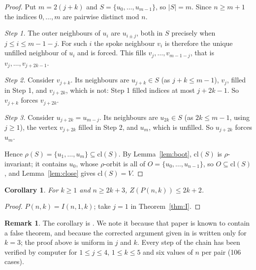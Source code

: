 \documentclass[11pt]{article}
\newtheorem{corollary}[theorem]{Corollary}
\theoremstyle{definition}
\newtheorem{remark}[theorem]{Remark}
\begin{document}
\begin{proof}
Put $m=2(j+k)$ and $S=\{u_0,\dots,u_{m-1}\}$, so $|S|=m$. Since
$n\ge m+1$ the indices $0,\dots,m$ are pairwise distinct mod $n$.

\emph{Step 1.} The outer neighbours of $u_i$ are $u_{i\pm j}$, both in $S$
precisely when $j\le i\le m-1-j$. For such $i$ the spoke neighbour $v_i$ is
therefore the unique unfilled neighbour of $u_i$ and is forced. This fills
$v_j,\dots,v_{m-1-j}$, that is $v_j,\dots,v_{j+2k-1}$.

\emph{Step 2.} Consider $v_{j+k}$. Its neighbours are $u_{j+k}\in S$ (as
$j+k\le m-1$), $v_{j}$, filled in Step 1, and $v_{j+2k}$, which is not:
Step 1 filled indices at most $j+2k-1$. So $v_{j+k}$ forces $v_{j+2k}$.

\emph{Step 3.} Consider $u_{j+2k}=u_{m-j}$. Its neighbours are $u_{2k}\in S$
(as $2k\le m-1$, using $j\ge1$), the vertex $v_{j+2k}$ filled in Step 2, and
$u_{m}$, which is unfilled. So $u_{j+2k}$ forces $u_m$.

Hence $\rho(S)=\{u_1,\dots,u_m\}\subseteq\mathrm{cl}(S)$. By
Lemma~\ref{lem:boot}, $\mathrm{cl}(S)$ is $\rho$-invariant; it contains $u_0$,
whose $\rho$-orbit is all of $O=\{u_0,\dots,u_{n-1}\}$, so $O\subseteq
\mathrm{cl}(S)$, and Lemma~\ref{lem:close} gives $\mathrm{cl}(S)=V$.
\end{proof}

\begin{corollary}
For $k\ge1$ and $n\ge2k+3$, $Z(P(n,k))\le 2k+2$.
\end{corollary}

\begin{proof}
$P(n,k)=I(n,1,k)$; take $j=1$ in Theorem~\ref{thm:I}.
\end{proof}

\begin{remark}
The corollary is \cite[Thm.~2.2]{RST}. We note it because that paper is known
to contain a false theorem, and because the corrected argument given in
\cite{K} is written only for $k=3$; the proof above is uniform in $j$ and $k$.
Every step of the chain has been verified by computer for $1\le j\le4$,
$1\le k\le5$ and six values of $n$ per pair (106 cases).
\end{remark}
\end{document}
